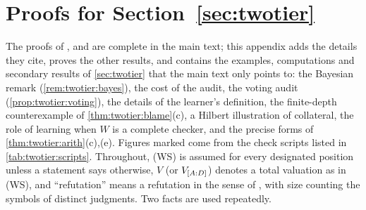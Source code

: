 \providecommand{\Steps}{\mathrm{Steps}}
\providecommand{\Ttrust}{T_{\mathrm{trust}}}
\providecommand{\Fres}[1]{F^{(#1)}_{\mathrm{res}}}
\providecommand{\Refut}{\mathrm{Ref}}
\providecommand{\Conf}{\mathrm{Conf}}
\providecommand{\Coll}{\mathrm{Coll}}
\providecommand{\Fsurv}[1]{F^{\mathrm{surv}}_{#1}}
\providecommand{\TTL}{\mathrm{TTL}}
\providecommand{\mgu}{\mathrm{mgu}}
\providecommand{\Prf}{\mathrm{Prf}}
\providecommand{\Sub}{\mathrm{Sub}}
\providecommand{\RobQ}{\mathsf{Q}}
\providecommand{\Ccal}{\mathcal{C}}
\providecommand{\Vcal}{\mathcal{V}}

\section{Proofs for Section~\ref{sec:twotier}}\label{app:twotier}

The proofs of ,  and  are complete in the main text; this appendix adds the details they cite, proves the other results, and contains the examples, computations and secondary results of \cref{sec:twotier} that the main text only points to: the Bayesian remark (\cref{rem:twotier:bayes}), the cost of the audit, the voting audit (\cref{prop:twotier:voting}), the details of the learner's definition, the finite-depth counterexample of \cref{thm:twotier:blame}(c), a Hilbert illustration of collateral, the role of learning when $W$ is a complete checker, and the precise forms of \cref{thm:twotier:arith}(c),(e). Figures marked  come from the check scripts listed in \cref{tab:twotier:scripts}. Throughout, (WS) is assumed for every designated position unless a statement says otherwise, $V$ (or $V_{[A : D]}$) denotes a total valuation as in (WS), and ``refutation'' means a refutation in the sense of , with size counting the symbols of distinct judgments. Two facts are used repeatedly.


